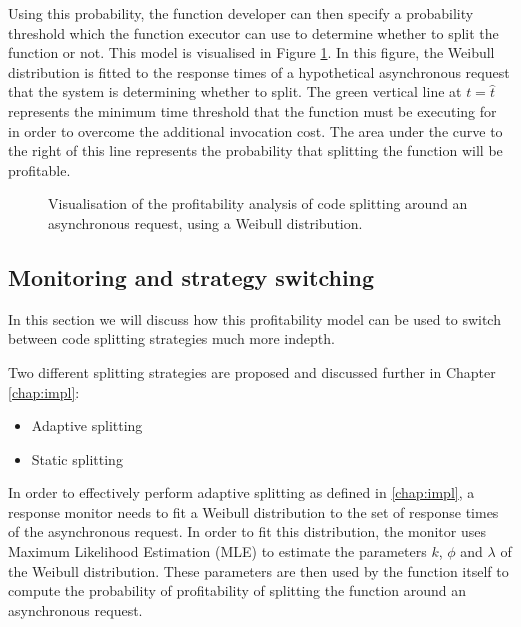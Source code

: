 Using this probability, the function developer can then specify a probability threshold which the function executor can use to determine whether to split the function or not. This model is visualised in Figure \ref{fig:splitting-profitability-analysis-weibull-fit}. In this figure, the Weibull distribution is fitted to the response times of a hypothetical asynchronous request that the system is determining whether to split. The green vertical line at $t = \hat{t}$ represents the minimum time threshold that the function must be executing for in order to overcome the additional invocation cost. The area under the curve to the right of this line represents the probability that splitting the function will be profitable.

\begin{figure}
    \begin{center}
        
    \end{center}
    \caption{Visualisation of the profitability analysis of code splitting around an asynchronous request, using a Weibull distribution.}
    \label{fig:splitting-profitability-analysis-weibull-fit}
\end{figure}

\subsection{Monitoring and strategy switching}
\label{sec:faaas-monitoring-and-strat-switching-design}
In this section we will discuss how this profitability model can be used to switch between code splitting strategies much more indepth.

Two different splitting strategies are proposed and discussed further in Chapter \ref{chap:impl}:

\begin{itemize}
    \item Adaptive splitting
    \item Static splitting
\end{itemize}


In order to effectively perform adaptive splitting as defined in \ref{chap:impl}, a response monitor needs to fit a Weibull distribution to the set of response times of the asynchronous request. In order to fit this distribution, the monitor uses Maximum Likelihood Estimation (MLE) to estimate the parameters $k$, $\phi$ and $\lambda$ of the Weibull distribution. These parameters are then used by the function itself to compute the probability of profitability of splitting the function around an asynchronous request.

